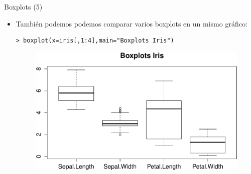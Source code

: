 \documentclass[handout]{beamer}
\begin{document}
\begin{frame}[fragile]{Boxplots (5)}
\scriptsize{
\begin{itemize}

\item También podemos podemos comparar varios boxplots en un mismo gráfico:
\begin{verbatim}
> boxplot(x=iris[,1:4],main="Boxplots Iris")
\end{verbatim}

 \begin{figure}[h!]
	\centering
	\includegraphics[scale=0.5]{pics/boxplotiris.pdf}		
\end{figure} 
 
\end{itemize}

}
\end{frame}
\end{document}
